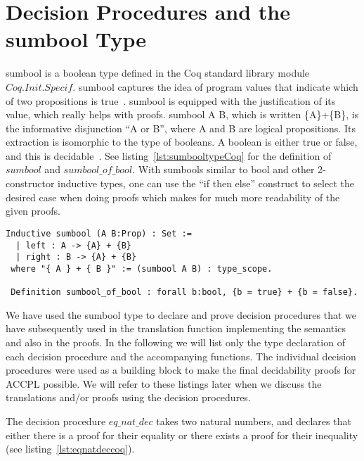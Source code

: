 \section{Decision Procedures and the sumbool Type}\label{sec:sumboolsection}

sumbool is a boolean type defined in the Coq standard library module $Coq.Init.Specif$. sumbool captures the idea of program values that indicate which of two propositions is true~\cite{chlipalacpdt2011}. sumbool is equipped with the justification of its value, which really helps with proofs. sumbool A B, which is written \{A\}+\{B\}, is the informative disjunction ``A or B'', where A and B are logical propositions. Its extraction is isomorphic to the type of booleans. A boolean is either true or false, and this is decidable~\cite{Coq:manual}. See listing~\ref{lst:sumbooltypeCoq} for the definition of $sumbool$ and $sumbool\_of\_bool$. With sumbools similar to bool and other 2-constructor inductive types, one can use the ``if then else'' construct to select the desired case when doing proofs which makes for much more readability of the given proofs.

\begin{minipage}[c]{0.95\textwidth}
\begin{lstlisting}
Inductive sumbool (A B:Prop) : Set :=
  | left : A -> {A} + {B}
  | right : B -> {A} + {B}
 where "{ A } + { B }" := (sumbool A B) : type_scope.
 
 Definition sumbool_of_bool : forall b:bool, {b = true} + {b = false}.
\end{lstlisting}
\end{minipage}

We have used the sumbool type to declare and prove decision procedures that we have subsequently used in the translation function implementing the semantics and also in the proofs. In the following we will list only the type declaration of each decision procedure and the accompanying functions. The individual decision procedures were used as a building block to make the final decidability proofs for \ac{ACCPL} possible. We will refer to these listings later when we discuss the translations and/or proofs using the decision procedures.

The decision procedure $eq\_nat\_dec$ takes two natural numbers, and declares that either there is a proof for their equality or there exists a proof for their inequality (see listing~\ref{lst:eqnatdeccoq}).


